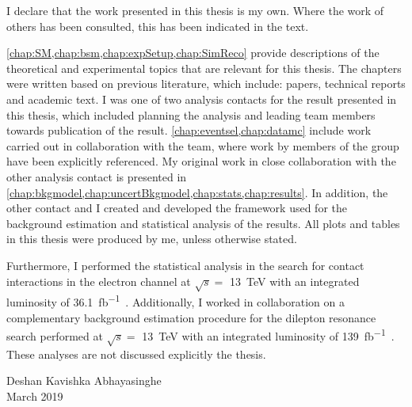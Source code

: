 
\cleardoublepage{}
\begin{declaration}
    I declare that the work presented in this thesis is my own.
    Where the work of others has been consulted, this has been indicated in the text.

    \cref{chap:SM,chap:bsm,chap:expSetup,chap:SimReco} provide descriptions of the theoretical and experimental topics that are relevant for this thesis. The chapters were written based on previous literature, which include: papers, technical reports and academic text. I was one of two analysis contacts for the result presented in this thesis, which included planning the analysis and leading team members towards publication of the result. \cref{chap:eventsel,chap:datamc} include work carried out in collaboration with the team, where work by members of the group have been explicitly referenced. My original work in close collaboration with the other analysis contact is presented in \cref{chap:bkgmodel,chap:uncertBkgmodel,chap:stats,chap:results}. In addition, the other contact and I created and developed the framework used for the background estimation and statistical analysis of the results. All plots and tables in this thesis were produced by me, unless otherwise stated. 

    Furthermore, I performed the statistical analysis in the search for contact interactions in the electron channel at $\sqrt{s} = $ \SI{13}{\tera\electronvolt} with an integrated luminosity of \SI{36.1}{\femto\barn^{-1}}~\cite{EXOT-2016-05}. Additionally, I worked in collaboration on a complementary background estimation procedure for the dilepton resonance search performed  at $\sqrt{s} = $ \SI{13}{\tera\electronvolt} with an integrated luminosity of \SI{139}{\femto\barn^{-1}}~\cite{Aad:2019fac}. These analyses are not discussed explicitly the thesis. 
    \vspace*{1.5cm}
    \begin{flushright}
        Deshan Kavishka Abhayasinghe \\
        March 2019
    \end{flushright}
\end{declaration}


